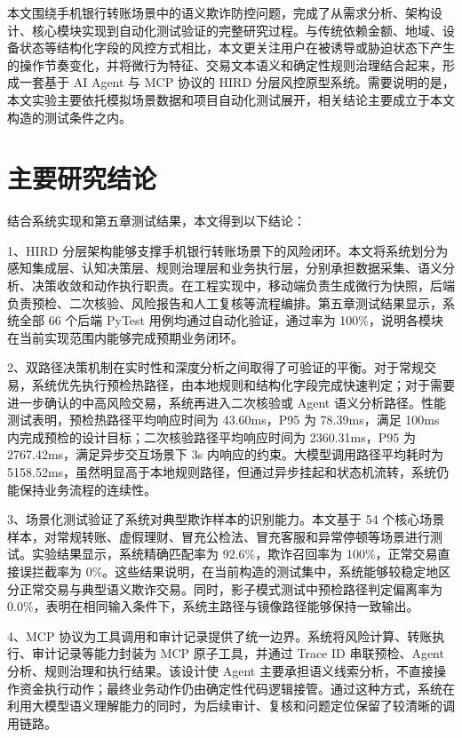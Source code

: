 \documentclass{xduugthesis}
\begin{document}
本文围绕手机银行转账场景中的语义欺诈防控问题，完成了从需求分析、架构设计、核心模块实现到自动化测试验证的完整研究过程。与传统依赖金额、地域、设备状态等结构化字段的风控方式相比，本文更关注用户在被诱导或胁迫状态下产生的操作节奏变化，并将微行为特征、交易文本语义和确定性规则治理结合起来，形成一套基于 AI Agent 与 MCP 协议的 HIRD 分层风控原型系统。需要说明的是，本文实验主要依托模拟场景数据和项目自动化测试展开，相关结论主要成立于本文构造的测试条件之内。

\section{主要研究结论}

结合系统实现和第五章测试结果，本文得到以下结论：

1、HIRD 分层架构能够支撑手机银行转账场景下的风险闭环。本文将系统划分为感知集成层、认知决策层、规则治理层和业务执行层，分别承担数据采集、语义分析、决策收敛和动作执行职责。在工程实现中，移动端负责生成微行为快照，后端负责预检、二次核验、风险报告和人工复核等流程编排。第五章测试结果显示，系统全部 66 个后端 PyTest 用例均通过自动化验证，通过率为 100\%，说明各模块在当前实现范围内能够完成预期业务闭环。

2、双路径决策机制在实时性和深度分析之间取得了可验证的平衡。对于常规交易，系统优先执行预检热路径，由本地规则和结构化字段完成快速判定；对于需要进一步确认的中高风险交易，系统再进入二次核验或 Agent 语义分析路径。性能测试表明，预检热路径平均响应时间为 43.60ms，P95 为 78.39ms，满足 100ms 内完成预检的设计目标；二次核验路径平均响应时间为 2360.31ms，P95 为 2767.42ms，满足异步交互场景下 3s 内响应的约束。大模型调用路径平均耗时为 5158.52ms，虽然明显高于本地规则路径，但通过异步挂起和状态机流转，系统仍能保持业务流程的连续性。

3、场景化测试验证了系统对典型欺诈样本的识别能力。本文基于 54 个核心场景样本，对常规转账、虚假理财、冒充公检法、冒充客服和异常停顿等场景进行测试。实验结果显示，系统精确匹配率为 92.6\%，欺诈召回率为 100\%，正常交易直接误拦截率为 0\%。这些结果说明，在当前构造的测试集中，系统能够较稳定地区分正常交易与典型语义欺诈交易。同时，影子模式测试中预检路径判定偏离率为 0.0\%，表明在相同输入条件下，系统主路径与镜像路径能够保持一致输出。

4、MCP 协议为工具调用和审计记录提供了统一边界。系统将风险计算、转账执行、审计记录等能力封装为 MCP 原子工具，并通过 Trace ID 串联预检、Agent 分析、规则治理和执行结果。该设计使 Agent 主要承担语义线索分析，不直接操作资金执行动作；最终业务动作仍由确定性代码逻辑接管。通过这种方式，系统在利用大模型语义理解能力的同时，为后续审计、复核和问题定位保留了较清晰的调用链路。
\end{document}
